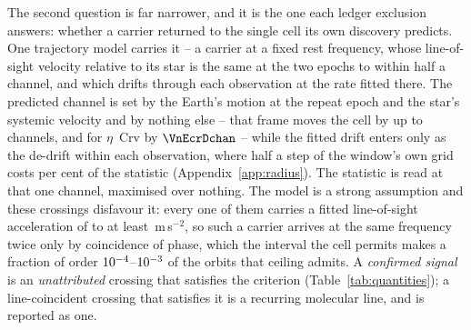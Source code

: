 The second question is far narrower, and it is the one each ledger exclusion
answers: whether a carrier returned to the single cell its own discovery
predicts. One trajectory model carries it -- a carrier at a fixed rest
frequency, whose line-of-sight velocity relative to its star is the same at
the two epochs to within half a channel, and which drifts through each
observation at the rate fitted there. The predicted channel is set by the
Earth's motion at the repeat epoch and the star's systemic velocity and by
nothing else -- that frame moves the cell by up to \ZtFrameChanMax{} channels,
and for $\eta$~Crv by $\VnEcrDchan$ -- while the fitted drift enters only as
the de-drift within each observation, where half a step of the window's own
grid costs \RjDriftPct{} per cent of the statistic
(Appendix~\ref{app:radius}). The statistic is read at that one channel,
maximised over nothing. The model is a strong assumption and these crossings
disfavour it: every one of them carries a fitted line-of-sight acceleration of
\ZtALosLo{} to at least \ZtALosHi\,m\,s$^{-2}$, so such a carrier arrives at the same
frequency twice only by coincidence of phase, which the interval the cell
permits makes a fraction of order $10^{-4}$--$10^{-3}$
of the orbits that ceiling admits. A
\emph{confirmed signal} is an \emph{unattributed} crossing that satisfies the
criterion (Table~\ref{tab:quantities}); a line-coincident crossing that
satisfies it is a recurring molecular line, and is reported as one.

